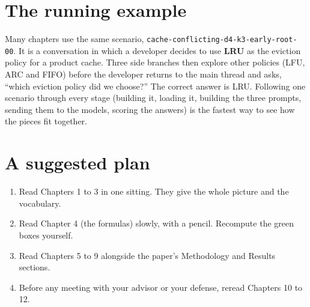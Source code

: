 \section*{The running example}

Many chapters use the same scenario, \texttt{cache-conflicting-d4-k3-early-root-00}. It is a conversation in which a developer decides to use \textbf{LRU} as the eviction policy for a product cache. Three side branches then explore other policies (LFU, ARC and FIFO) before the developer returns to the main thread and asks, ``which eviction policy did we choose?'' The correct answer is LRU. Following one scenario through every stage (building it, loading it, building the three prompts, sending them to the models, scoring the answers) is the fastest way to see how the pieces fit together.

\section*{A suggested plan}

\begin{enumerate}
\item Read Chapters 1 to 3 in one sitting. They give the whole picture and the vocabulary.
\item Read Chapter 4 (the formulas) slowly, with a pencil. Recompute the green boxes yourself.
\item Read Chapters 5 to 9 alongside the paper's Methodology and Results sections.
\item Before any meeting with your advisor or your defense, reread Chapters 10 to 12.
\end{enumerate}
